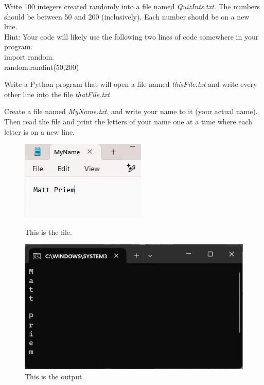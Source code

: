 


	\item 
		Write 100 integers created randomly into a file named \textit{QuizInts.txt}. 
		The numbers should be between 50 and 200 (inclusively). 
		Each number should be on a new line.\\
		Hint: Your code will likely use the following two lines of code somewhere in your program.\\
			\tab import random.\\
			\tab random.randint(50,200)

	\item 
		Write a Python program that will open a file named \textit{thisFile.txt} and write every 
		other line into the file
		\textit{thatFile.txt}

	\item
		Create a file named \textit{MyName.txt}, and write your name to it (your actual name).	 
		Then read the file and print the letters of your name one at a time where each letter is on a new line.
		\begin{figure}[ht]
			\centering
			\begin{minipage}[b]{.4\textwidth}
				\centering
				\includegraphics[scale=1]{imgs/nameFile.png}
				\caption{This is the file.}	
			\end{minipage}
			\hspace*{2em}
			\begin{minipage}[b]{.4\textwidth}
				\centering
				\includegraphics[width=1\textwidth]{imgs/nameOutput.png}
				\caption{This is the output.}
			\end{minipage}
		\end{figure}


